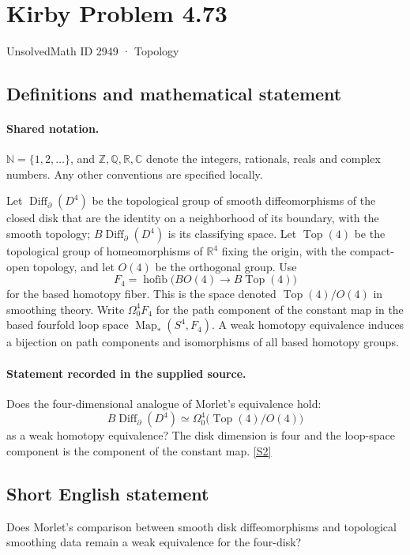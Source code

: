\documentclass[11pt]{article}
\newcommand{\sref}[2]{\hyperlink{source:#1:#2}{[S#2]}}
\begin{document}
\setcounter{section}{2948}
\section{Kirby Problem 4.73}\label{2949}
{\small\sffamily UnsolvedMath ID 2949 · Topology}
\subsection{Definitions and mathematical statement}

\paragraph{Shared notation.}$\mathbb N=\{1,2,\ldots\}$, and $\mathbb Z,\mathbb Q,\mathbb R,\mathbb C$ denote the integers, rationals, reals and complex numbers. Any other conventions are specified locally.


Let $\operatorname{Diff}_{\partial}(D^4)$ be the topological group of smooth diffeomorphisms of the closed disk that are the identity on a neighborhood of its boundary, with the smooth topology; $B\operatorname{Diff}_{\partial}(D^4)$ is its classifying space. Let $\operatorname{Top}(4)$ be the topological group of homeomorphisms of $\mathbb R^4$ fixing the origin, with the compact-open topology, and let $O(4)$ be the orthogonal group. Use
\[
F_4=\operatorname{hofib}\bigl(BO(4)\longrightarrow B\operatorname{Top}(4)\bigr)
\]
for the based homotopy fiber. This is the space denoted $\operatorname{Top}(4)/O(4)$ in smoothing theory. Write $\Omega^4_0F_4$ for the path component of the constant map in the based fourfold loop space $\operatorname{Map}_*(S^4,F_4)$. A weak homotopy equivalence induces a bijection on path components and isomorphisms of all based homotopy groups.
\paragraph{Statement recorded in the supplied source.}
Does the four-dimensional analogue of Morlet's equivalence hold:
\[
 B\operatorname{Diff}_{\partial}(D^4)\simeq\Omega^4_0\bigl(\operatorname{Top}(4)/O(4)\bigr)
\]
as a weak homotopy equivalence? The disk dimension is four and the loop-space component is the component of the constant map. \sref{2949}{2}
\subsection{Short English statement}
Does Morlet’s comparison between smooth disk diffeomorphisms and topological smoothing data remain a weak equivalence for the four-disk?
\end{document}
